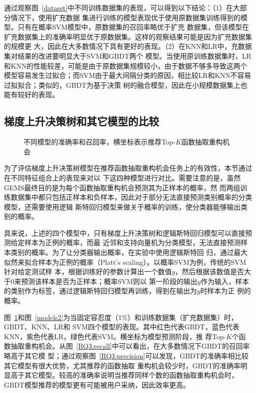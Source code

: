 通过观察图~\ref{dataset}中不同训练数据集的表现，可以得到以下结论：（1）在大部分情况下，使用扩充数据
集进行训练的模型表现优于使用原数据集训练得到的模型。只有在概率SVM模型中，原数据集的召回率略优于扩充
数据集，但该模型在扩充数据集上的准确率明显优于原数据集。这样的观察结果可能是因为扩充数据集的规模更
大，因此在大多数情况下具有更好的表现。（2）在KNN和LR中，充数据集对结果的改进要明显大于SVM和GBDT两个
模型。当使用原训练数据集时，LR和KNN的性能较差，可能是由于原数据集规模较小，由于数据不够多导致这两个
模型容易发生过拟合；而SVM由于最大间隔分类的原因，相比较LR和KNN不容易过拟拟合；类似的，GBDT为基于决策
树的融合模型，因此在小规模数据集上也能有较好的表现。

\subsection{梯度上升决策树和其它模型的比较}\label{RQ3}

\begin{figure}
\centering
{}
\hfill
{}
\caption{不同模型的准确率和召回率，横坐标表示推荐Top-$K$函数抽取重构机会}
\label{models1}
\end{figure}

为了评估梯度上升决策树模型在推荐函数抽取重构机会任务上的有效性，本节通过在不同特征组合上的表现来对以
下这四种模型进行对比。需要注意的是，虽然GEMS最终目的是为每个函数抽取重构机会预测其为正样本的概率，然
而两组训练数据集中都只包括正样本和负样本，因此对于部分无法直接预测类别概率的分类模型，还需要使用逻辑
斯特回归模型来做关于概率的训练，使分类器能够输出类别的概率。

具来说，上述的四个模型中，只有梯度上升决策树和逻辑斯特回归模型可以直接预测给定样本为正例的概率，而最
近邻和支持向量机为分类模型，无法直接预测样本类别的概率。为了让分类器输出概率，在实验中使用逻辑斯特回
归，通过最大似然来拟合样本为正例的概率（Platt's scaling）。以概率SVM为例，传统的SVM针对给定测试样
本，根据训练好的参数计算出一个数值$y$，然后根据该数值是否大于0来预测该样本是否为正样本；概率SVM则以
第一阶段的输出$y$作为输入，样本的类别作为标签，通过逻辑斯特回归模型再训练，得到在输出为$y$时样本为正
例的概率。

图~\ref{models1}和图~\ref{models2}为当固定容忍度（1\%）和训练数据集（扩充数据集）时，GBDT、KNN、LR和
SVM四个模型的表现。其中红色代表GBDT，蓝色代表KNN，紫色代表LR，绿色代表SVM。横坐标为模型预测阶段，推
荐Top-$K$个函数抽取重构机会。从图~\ref{RQ3:recall}中可以看出，在大多数情况下GBDT的召回率略高于其它模
型；通过观察图~\ref{RQ3:precision}可以发现，GBDT的准确率相比较其它模型有很大优势，尤其推荐的函数抽取
重构机会较少时，GBDT的准确率明显高于其它模型。较高的准确率说明当推荐同样个数的函数抽取重构机会时，
GBDT模型推荐的模型更有可能被用户采纳，因此效率更高。

